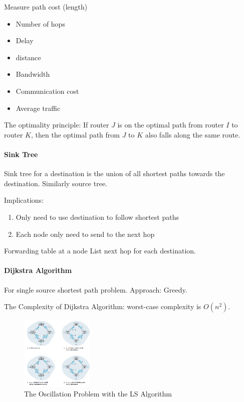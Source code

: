 Measure path cost (length)
\begin{itemize}
    \item Number of hops
    \item Delay
    \item distance
    \item Bandwidth
    \item Communication cost
    \item Average traffic
\end{itemize}

The optimality principle: If router $J$ is on the optimal path from router $I$ to router $K$, then the optimal path from $J$ to $K$ also falls along the same route.

\paragraph{Sink Tree}
Sink tree for a destination is the union of all shortest paths towards the destination. Similarly source tree. 

Implications:
\begin{enumerate}
    \item Only need to use destination to follow shortest paths
    \item Each node only need to send to the next hop
\end{enumerate}

Forwarding table at a node List next hop for each destination. 

\paragraph{Dijkstra Algorithm}For single source shortest path problem. Approach: Greedy.

The Complexity of Dijkstra Algorithm: worst-case complexity is $O(n^2)$. 

\begin{figure}[!htb]
    \centering
    \includegraphics[width=0.309\textwidth]{pic/CN5/Oscillation}
    \caption{The Oscillation Problem with the LS Algorithm}
\end{figure}

